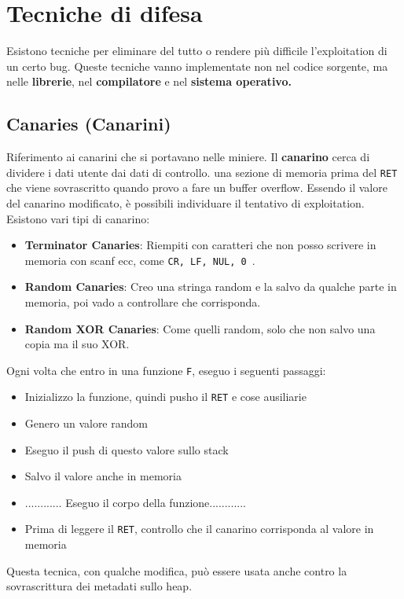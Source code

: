 \documentclass[a4paper,12pt]{article}
\begin{document}
\section{Tecniche di difesa}
Esistono tecniche per eliminare del tutto o rendere più difficile l'exploitation di un certo bug. Queste tecniche vanno implementate non nel codice sorgente, ma nelle \textbf{librerie}, nel \textbf{compilatore} e nel \textbf{sistema operativo.}

\subsection{Canaries (Canarini)}
Riferimento ai canarini che si portavano nelle miniere. Il \textbf{canarino} cerca di dividere i dati utente dai dati di controllo. \E una sezione di memoria prima del \texttt{RET} che viene sovrascritto quando provo a fare un buffer overflow. Essendo il valore del canarino modificato, è possibili individuare il tentativo di exploitation. Esistono vari tipi di canarino:
\begin{itemize}
\item \textbf{Terminator Canaries}: Riempiti con caratteri che non posso scrivere in memoria con scanf ecc, come \texttt{CR, LF, NUL, 0 }.
\item \textbf{Random Canaries}: Creo una stringa random e la salvo da qualche parte in memoria, poi vado a controllare che corrisponda.
\item \textbf{Random XOR Canaries}: Come quelli random, solo che non salvo una copia ma il suo XOR.
\end{itemize}

Ogni volta che entro in una funzione \texttt{F}, eseguo i seguenti passaggi:
\begin{itemize}
\item Inizializzo la funzione, quindi pusho il \texttt{RET} e cose ausiliarie
\item Genero un valore random
\item Eseguo il push di questo valore sullo stack
\item Salvo il valore anche in memoria
\item ............ Eseguo il corpo della funzione............
\item Prima di leggere il \texttt{RET}, controllo che il canarino corrisponda al valore in memoria
\end{itemize}
Questa tecnica, con qualche modifica, può essere usata anche contro la sovrascrittura dei metadati sullo heap.
\end{document}
